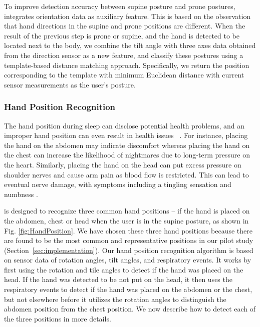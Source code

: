 To improve detection accuracy between supine posture and prone postures, \systemname integrates orientation data as auxiliary feature. This is based on the observation that hand directions in the supine and prone positions are different. When the result of the previous step is prone or supine, and the hand is detected to be located next to the body, we combine the tilt angle with three axes data obtained from the direction sensor as a new feature, and classify these postures using a template-based distance matching approach. Specifically, we return the position corresponding to the template with minimum Euclidean distance with current sensor measurements as the user's posture. %


\subsubsection{Hand Position Recognition\label{sec:handpr}}

The hand position during sleep can disclose potential health problems, and an improper hand position can even result in health issues~
\cite{position2014}. For instance, placing the hand on the abdomen may indicate discomfort whereas placing the hand on the chest can
increase the likelihood of nightmares due to long-term pressure on the heart. Similarly, placing the hand on the head can put excess
pressure on shoulder nerves and cause arm pain as blood flow is restricted. This can lead to eventual nerve damage, with symptoms including
a tingling sensation and numbness \cite{position2014}.


{\systemname} is designed to recognize three common hand positions -- if the hand is placed on the abdomen, chest or head when the user is
in the supine posture, as shown in Fig. \ref{fig:HandPosition}. We have chosen these three hand positions because there are found to be the
most common and representative positions in our pilot study (Section~\ref{sec:implementation}). Our hand position recognition algorithm is
based on sensor data of rotation angles, tilt angles, and respiratory events. It works by first using the rotation and tile angles to
detect if the hand was placed on the head. If the hand was detected to be not put on the head, it then uses the respiratory events to
detect if the hand was placed on the abdomen or the chest, but not elsewhere before it utilizes the rotation angles to distinguish the
abdomen position from the chest position. We now describe how to detect each of the three positions in more details.




